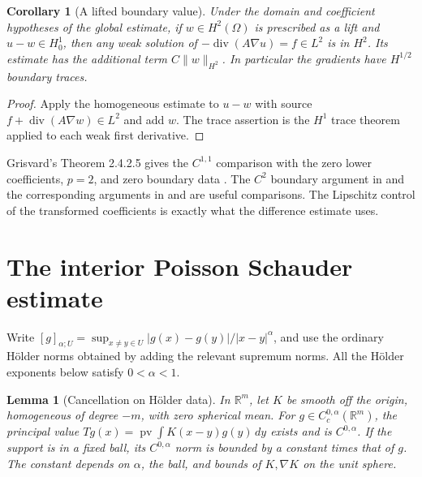 \documentclass[11pt,oneside,openany]{book}
\theoremstyle{plain}
\newtheorem{lemma}[theorem]{Lemma}
\newtheorem{corollary}[theorem]{Corollary}
\theoremstyle{definition}
\theoremstyle{remark}
\begin{document}
\begin{corollary}[A lifted boundary value]\label{pde:elliptic-h2-lift}
Under the domain and coefficient hypotheses of the global estimate,
if \(w\in H^2(\Omega)\) is prescribed as a lift and \(u-w\in H_0^1\),
then any weak solution
of \(-\operatorname{div}(A\nabla u)=f\in L^2\) is in \(H^2\).
Its estimate has the additional term \(C\|w\|_{H^2}\).
In particular the gradients have \(H^{1/2}\) boundary traces.
\end{corollary}

\begin{proof}
Apply the homogeneous estimate to \(u-w\) with source
\(f+\operatorname{div}(A\nabla w)\in L^2\) and add \(w\).
The trace assertion is the \(H^1\) trace theorem applied to
each weak first derivative.
\end{proof}

Grisvard's Theorem 2.4.2.5 gives the \(C^{1,1}\) comparison
with the zero lower coefficients, \(p=2\), and zero boundary
data \cite[pp. 124--125]{Grisvard}. The \(C^2\) boundary argument
in \cite[Section 6.3.2]{Evans} and the corresponding arguments
in \cite[Section 9.5.2]{RR} and \cite[Section 8.4]{GT} are
useful comparisons. The Lipschitz control of the transformed
coefficients is exactly what the difference estimate uses.

\section{The interior Poisson Schauder estimate}\label{pde:E07}

Write \([g]_{\alpha;U}=\sup_{x\ne y\in U}
 |g(x)-g(y)|/|x-y|^\alpha\), and use the ordinary Hölder
norms obtained by adding the relevant supremum norms.
All the Hölder exponents below satisfy \(0<\alpha<1\).

\begin{lemma}[Cancellation on Hölder data]\label{pde:elliptic-holder-kernel}
In \(\mathbb R^m\), let \(K\) be smooth off the origin,
homogeneous of degree \(-m\), with zero spherical mean.
For \(g\in C_c^{0,\alpha}(\mathbb R^m)\), the principal value
\(Tg(x)=\operatorname{pv}\int K(x-y)g(y)\,dy\) exists and is
\(C^{0,\alpha}\). If the support is in a fixed ball, its
\(C^{0,\alpha}\) norm is bounded by a constant times that of \(g\).
The constant depends on \(\alpha\), the ball, and bounds of
\(K,\nabla K\) on the unit sphere.
\end{lemma}
\end{document}
